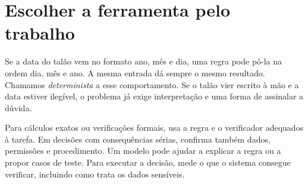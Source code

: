 \section{Escolher a ferramenta pelo trabalho}

Se a data do talão vem no formato ano, mês e dia, uma regra pode pô-la na ordem dia, mês e ano. A mesma entrada dá sempre o mesmo resultado. Chamamos \emph{determinista} a esse comportamento. Se o talão vier escrito à mão e a data estiver ilegível, o problema já exige interpretação e uma forma de assinalar a dúvida.

Para cálculos exatos ou verificações formais, usa a regra e o verificador adequados à tarefa. Em decisões com consequências sérias, confirma também dados, permissões e procedimento. Um modelo pode ajudar a explicar a regra ou a propor casos de teste. Para executar a decisão, mede o que o sistema consegue verificar, incluindo como trata os dados sensíveis.

